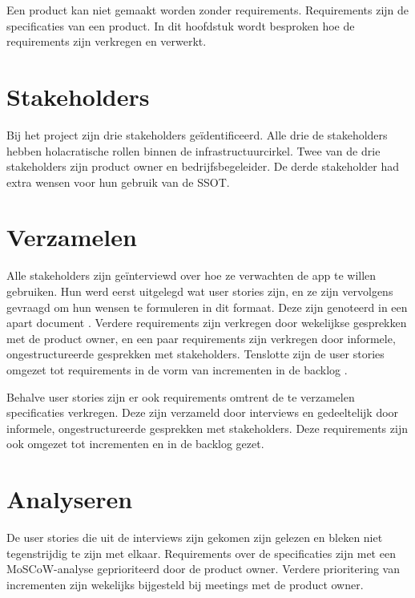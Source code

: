 \documentclass[../report.tex]{subfiles}
\begin{document}
Een product kan niet gemaakt worden zonder requirements. Requirements zijn de specificaties van een product. In dit hoofdstuk wordt besproken hoe de requirements zijn verkregen en verwerkt.


\section{Stakeholders}

Bij het project zijn drie stakeholders geïdentificeerd. Alle drie de stakeholders hebben holacratische rollen binnen de infrastructuurcirkel. Twee van de drie stakeholders zijn \gls*{product owner} en bedrijfsbegeleider. De derde stakeholder had extra wensen voor hun gebruik van de SSOT.

\section{Verzamelen}

Alle stakeholders zijn geïnterviewd over hoe ze verwachten de app te willen gebruiken. Hun werd eerst uitgelegd wat user stories zijn, en ze zijn vervolgens gevraagd om hun wensen te formuleren in dit formaat. Deze zijn genoteerd in een apart document \parencite{user_stories}. Verdere requirements zijn verkregen door wekelijkse gesprekken met de \gls*{product owner}, en een paar requirements zijn verkregen door informele, ongestructureerde gesprekken met stakeholders. Tenslotte zijn de user stories omgezet tot requirements in de vorm van incrementen in de backlog \parencite{backlog}.

Behalve user stories zijn er ook requirements omtrent de te verzamelen specificaties verkregen. Deze zijn verzameld door interviews en gedeeltelijk door informele, ongestructureerde gesprekken met stakeholders. Deze requirements zijn ook omgezet tot incrementen en in de backlog gezet.

\section{Analyseren}

De user stories die uit de interviews zijn gekomen zijn gelezen en bleken niet tegenstrijdig te zijn met elkaar. Requirements over de specificaties zijn met een MoSCoW-analyse geprioriteerd door de \gls*{product owner}. Verdere prioritering van incrementen zijn wekelijks bijgesteld bij meetings met de \gls*{product owner}.
\end{document}
